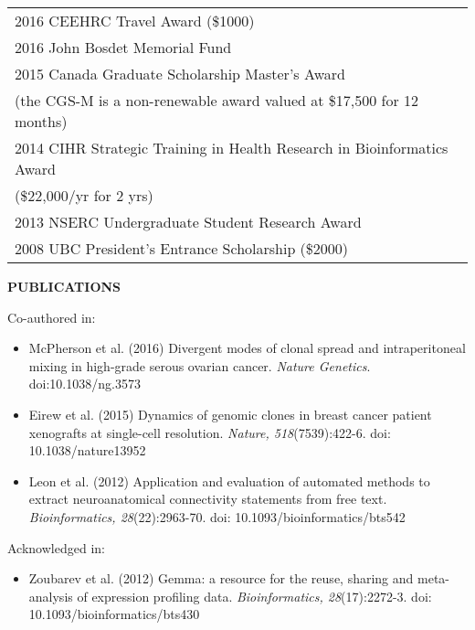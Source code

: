 \documentclass{res}
\renewcommand{\section}[1]{%
  \vspace{0.3in}%
  \centerline{\uppercase{\bf{#1}}}%
  \vspace{-6pt}}
\newcommand{\lineaward}[2]{%
  #1 \faTrophy{} #2\\[1ex]}
\newenvironment{publicationlists}{%
  \begin{itemize}\leftmargin=3em \itemindent=-1em \itemsep=2pt%
  }{%
  \end{itemize}}
\begin{document}
\begin{resume}
\begin{center}
  \begin{tabular}{l}
    \lineaward{2016}{CEEHRC Travel Award (\$1000)}
    \lineaward{2016}{John Bosdet Memorial Fund}
    \lineaward{2015}{Canada Graduate Scholarship Master's Award\\
      \hspace{1.25cm}\footnotesize{(the CGS-M is a non-renewable award valued at \$17,500 for 12 months)}}
    \lineaward{2014}{CIHR Strategic Training in Health Research in Bioinformatics Award\\
      \hspace{1.25cm}\footnotesize{(\$22,000/yr for 2 yrs)}}
    \lineaward{2013}{NSERC Undergraduate Student Research Award}
    \lineaward{2008}{UBC President's Entrance Scholarship (\$2000)}
  \end{tabular}
\end{center}
\vspace{-1em}

\section{Publications}

Co-authored in:\vspace{4pt}
\begin{publicationlists}
  \item McPherson et al. (2016) Divergent modes of clonal spread and intraperitoneal mixing in high-grade serous ovarian cancer. {\sl Nature Genetics}. doi:10.1038/ng.3573
  \item Eirew et al. (2015) Dynamics of genomic clones in breast cancer patient xenografts at single-cell resolution. {\sl Nature, 518}(7539):422-6. doi: 10.1038/nature13952
  \item Leon et al. (2012) Application and evaluation of automated methods to extract neuroanatomical connectivity statements from free text. {\sl Bioinformatics, 28}(22):2963-70. doi: 10.1093/bioinformatics/bts542
\end{publicationlists}

Acknowledged in:\vspace{4pt}
\begin{publicationlists}
  \item Zoubarev et al. (2012) Gemma: a resource for the reuse, sharing and meta-analysis of expression profiling data. {\sl Bioinformatics, 28}(17):2272-3. doi: 10.1093/bioinformatics/bts430
\end{publicationlists}


\end{resume}
\end{document}
